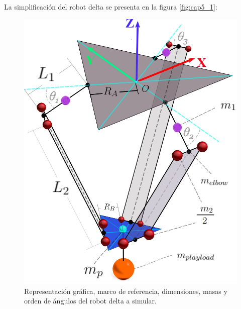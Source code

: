     \newpage
    
     La simplificación del robot delta se presenta en la figura \eqref{fig:cap5_1}:
    
    \begin{figure}[htb]
        \centering
        \includegraphics[width=0.87\linewidth]{Main/Chapter5/Images5/DIBUJO55.jpg}
        \caption{Representación gráfica, marco de referencia, dimensiones, masas y orden de ángulos del robot delta a simular.}
        \label{fig:cap5_1}
    \end{figure}
    
    
    